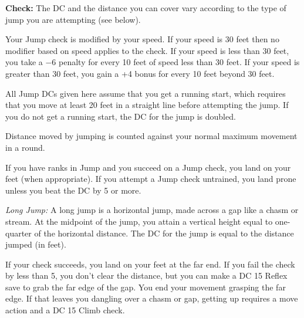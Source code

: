 \textbf{Check:} The DC and the distance you can cover vary according to the type of jump you are attempting (see below).

Your Jump check is modified by your speed. If your speed is 30 feet then no modifier based on speed applies to the check. If your speed is less than 30 feet, you take a $-6$ penalty for every 10 feet of speed less than 30 feet. If your speed is greater than 30 feet, you gain a +4 bonus for every 10 feet beyond 30 feet.

All Jump DCs given here assume that you get a running start, which requires that you move at least 20 feet in a straight line before attempting the jump. If you do not get a running start, the DC for the jump is doubled.

Distance moved by jumping is counted against your normal maximum movement in a round.

If you have ranks in Jump and you succeed on a Jump check, you land on your feet (when appropriate). If you attempt a Jump check untrained, you land prone unless you beat the DC by 5 or more.


\textit{Long Jump:} A long jump is a horizontal jump, made across a gap like a chasm or stream. At the midpoint of the jump, you attain a vertical height equal to one-quarter of the horizontal distance. The DC for the jump is equal to the distance jumped (in feet).

If your check succeeds, you land on your feet at the far end. If you fail the check by less than 5, you don't clear the distance, but you can make a DC 15 Reflex save to grab the far edge of the gap. You end your movement grasping the far edge. If that leaves you dangling over a chasm or gap, getting up requires a move action and a DC 15 Climb check.


